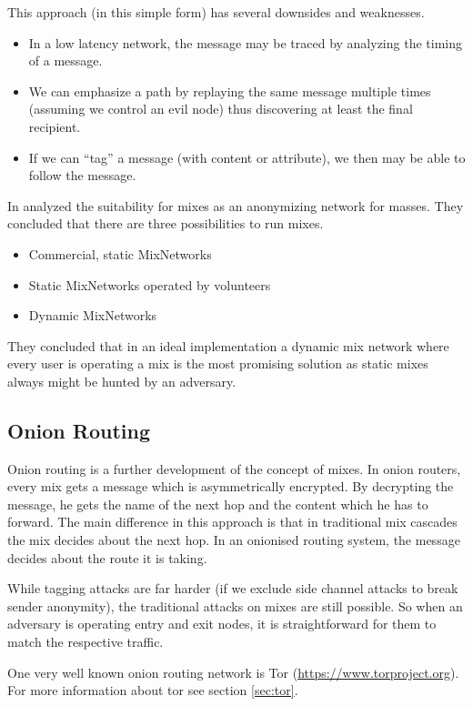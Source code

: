 This approach (in this simple form) has several downsides and weaknesses.

\begin{itemize}
	\item In a low latency network, the message may be traced by analyzing the timing of a message.
	\item We can emphasize a path by replaying the same message multiple times (assuming we control an evil node) thus discovering at least the final recipient.
	\item If we can ``tag'' a message (with content or attribute), we then may be able to follow the message.
\end{itemize}

In \citeyear{RP03-1} \citeauthor{RP03-1} analyzed the suitability for mixes as an anonymizing network for masses. They concluded that there are three possibilities to run mixes.
\begin{itemize}
	\item Commercial, static MixNetworks
	\item Static MixNetworks operated by volunteers
	\item Dynamic MixNetworks
\end{itemize}
They concluded that in an ideal implementation a dynamic mix network where every user is operating a mix is the most promising solution as static mixes always might be hunted by an adversary.

\subsection{Onion Routing}
Onion routing is a further development of the concept of mixes. In onion routers, every mix gets a message which is asymmetrically encrypted. By decrypting the message, he gets the name of the next hop and the content which he has to forward. The main difference in this approach is that in traditional mix cascades the mix decides about the next hop. In an onionised routing system, the message decides about the route it is taking. 

While tagging attacks are far harder (if we exclude side channel attacks to break sender anonymity), the traditional attacks on mixes are still possible. So when an adversary is operating entry and exit nodes, it is straightforward for them to match the respective traffic.

One very well known onion routing network is Tor (\href{https://www.torproject.org}{https://www.torproject.org}). For more information about tor see section \ref{sec:tor}.

